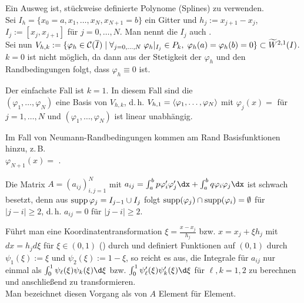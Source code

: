 \begin{Bem}
    Ein Ausweg ist, stückweise definierte Polynome (Splines) zu verwenden.\\
    Sei $I_h = \{x_0 = a, x_1, \dotsc, x_N, x_{N+1} = b\}$ ein Gitter und
    $h_j := x_{j+1} - x_j$, $I_j := [x_j, x_{j+1}]$ für $j = 0, \dotsc, N$.
    Man nennt die $I_j$ auch .\\
    Sei nun $V_{h,k} := \{\varphi_h \in \mathcal{C}(\overline{I}) \;|\;
    \forall_{j=0,\dotsc,N}\; \varphi_h|_{I_j} \in P_k,\;
    \varphi_h(a) = \varphi_h(b) = 0\} \subset \widetilde{W}^{2,1}(I)$.\\
    $k = 0$ ist nicht möglich, da dann aus der Stetigkeit der $\varphi_h$
    und den Randbedingungen folgt, dass $\varphi_h \equiv 0$ ist.

    Der einfachste Fall ist $k = 1$.
    In diesem Fall sind die \\
    $(\varphi_1, \dotsc, \varphi_N)$ eine Basis von $V_{h,k}$, d.\,h.
    $V_{h,1} = \left\langle{\varphi_1, \dotsc, \varphi_N}\right\rangle$
    mit $\varphi_j(x) =$  für $j = 1, \dotsc, N$
    und $(\varphi_1, \dotsc, \varphi_N)$ ist linear unabhängig.

    Im Fall von Neumann-Randbedingungen kommen am Rand Basisfunktionen hinzu,
    z.\,B.\\
    $\varphi_{N+1}(x) =$ .

    Die Matrix $A = (a_{ij})_{i,j=1}^N$ mit
    $a_{ij} = \int_a^b p\varphi_i'\varphi_j'\dx +
    \int_a^b q\varphi_i\varphi_j\dx$ ist schwach besetzt, denn aus
    $\operatorname{supp} \varphi_j = I_{j-1} \cup I_j$ folgt
    $\operatorname{supp} (\varphi_j) \cap \operatorname{supp}(\varphi_i) = \emptyset$ für $|j - i| \ge 2$,
    d.\,h. $a_{ij} = 0$ für $|j - i| \ge 2$.

    Führt man eine Koordinatentransformation
    $\xi = \frac{x - x_j}{h_j}$ bzw. $x = x_j + \xi h_j$ mit $dx = h_j d\xi$
    für $\xi \in (0, 1)$ ()
    durch und definiert Funktionen auf $(0, 1)$ durch
    $\psi_1(\xi) := \xi$ und $\psi_2(\xi) := 1 - \xi$, so reicht es aus,
    die Integrale für $a_{ij}$ nur einmal als
    $\int_0^1 \psi_\ell(\xi) \psi_k(\xi) \d\xi$ bzw.
    $\int_0^1 \psi_\ell'(\xi) \psi_k'(\xi) \d\xi$ für $\ell, k = 1, 2$
    zu berechnen und anschließend zu transformieren.\\
    Man bezeichnet diesen Vorgang als  von $A$
    Element für Element.
\end{Bem}

